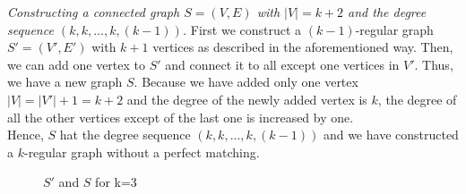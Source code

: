 \documentclass[a4paper]{article}
\begin{document}
\begin{solution}{11}
		\emph{Constructing a connected graph $S=(V,E)$ with $|V|=k+2$ and the degree sequence $( k,k,...,k,(k-1))$. }  
		First we construct a $(k-1)$-regular graph $S' = (V',E')$ with $k+1$ vertices as described in the aforementioned way. Then, we can add one vertex to $S'$ and connect it to all except one vertices in $V'$. Thus, we have a new graph $S$. 
		Because we have added only one vertex $|V| = |V'| +1 = k+2$ and the degree of the newly added vertex is $k$, the degree of all the other vertices except of the last one is increased by one.\\

		Hence, $S$ hat the degree sequence $(k,k,...,k,(k-1))$ and we have constructed a $k$-regular graph without a perfect matching.
		\begin{figure}[h]
			\centering
		\caption{$S'$ and $S$ for k=3}
		\end{figure}
	\end{solution}
	\newpage
\end{document}
